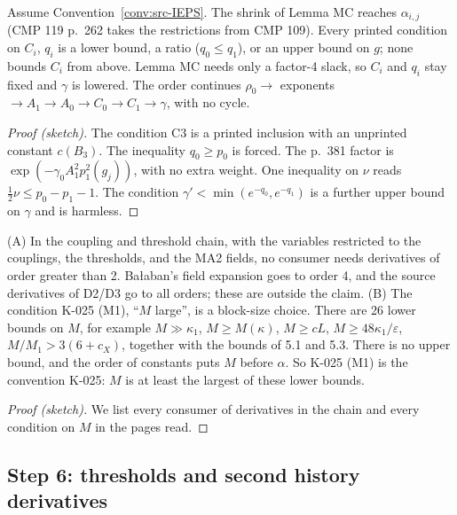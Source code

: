 \begin{proposition}\label{src:T2-IEPS-LF}
Assume Convention~\ref{conv:src-IEPS}. The shrink of Lemma MC reaches $\alpha_{i,j}$ (CMP 119 p.~262 takes the restrictions from CMP 109). Every printed condition on $C_i$, $q_i$ is a lower bound, a ratio ($q_0\le q_1$), or an upper bound on $g$; none bounds $C_i$ from above. Lemma MC needs only a factor-4 slack, so $C_i$ and $q_i$ stay fixed and $\gamma$ is lowered. The order continues $\rho_0\to$ exponents $\to A_1\to A_0\to C_0\to C_1\to\gamma$, with no cycle.
\end{proposition}
\begin{proof}[Proof (sketch)]
The condition C3 is a printed inclusion with an unprinted constant $c(B_3)$. The inequality $q_0\ge p_0$ is forced. The p.~381 factor is $\exp(-\gamma_0A_1^2p_1^2(g_j))$, with no extra weight. One inequality on $\nu$ reads $\tfrac12\nu\le p_0-p_1-1$. The condition $\gamma'<\min(e^{-q_0},e^{-q_1})$ is a further upper bound on $\gamma$ and is harmless.
\end{proof}

\begin{proposition}\label{src:HIGHER-M1}
(A) In the coupling and threshold chain, with the variables restricted to the couplings, the thresholds, and the MA2 fields, no consumer needs derivatives of order greater than 2. Ba{\l}aban's field expansion goes to order 4, and the source derivatives of D2/D3 go to all orders; these are outside the claim. (B) The condition K-025 (M1), ``$M$ large'', is a block-size choice. There are 26 lower bounds on $M$, for example $M\gg\kappa_1$, $M\ge M(\kappa)$, $M\ge cL$, $M\ge48\kappa_1/\varepsilon$, $M/M_1>3(6+c_X)$, together with the bounds of  5.1 and 5.3. There is no upper bound, and the order of constants puts $M$ before $\alpha$. So K-025 (M1) is the convention K-025: $M$ is at least the largest of these lower bounds.
\end{proposition}
\begin{proof}[Proof (sketch)]
We list every consumer of derivatives in the chain and every condition on $M$ in the pages read.
\end{proof}

\subsection{Step 6: thresholds and second history derivatives}\label{sec:src-thr}

